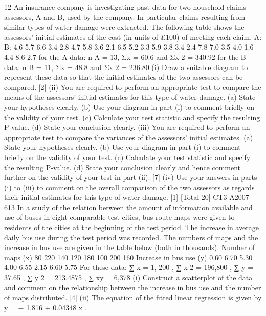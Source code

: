 \documentclass[a4paper,12pt]{article}
\begin{document}
\begin{enumerate}


12
An insurance company is investigating past data for two household claims assessors,
A and B, used by the company. In particular claims resulting from similar types of
water damage were extracted. The following table shows the assessors’ initial
estimates of the cost (in units of £100) of meeting each claim.
A:
B:
4.6
5.7
6.6
3.4
2.8
4.7
5.8
3.6
2.1
6.5
5.2
3.3
5.9
3.8
3.4
2.4
7.8
7.0
3.5
4.0
1.6
4.4
8.6
2.7
for the A data: n A = 13, Σx = 60.6 and Σx 2 = 340.92
for the B data: n B = 11, Σx = 48.8 and Σx 2 = 236.80
(i) Draw a suitable diagram to represent these data so that the initial estimates of
the two assessors can be compared.
[2]
(ii) You are required to perform an appropriate test to compare the means of the
assessors’ initial estimates for this type of water damage.
(a) State your hypotheses clearly.
(b) Use your diagram in part (i) to comment briefly on the validity of your
test.
(c) Calculate your test statistic and specify the resulting P-value.
(d) State your conclusion clearly.
(iii)
You are required to perform an appropriate test to compare the variances of
the assessors’ initial estimates.
(a) State your hypotheses clearly.
(b) Use your diagram in part (i) to comment briefly on the validity of your
test.
(c) Calculate your test statistic and specify the resulting P-value.
(d) State your conclusion clearly and hence comment further on the validity of your test in part (ii).
[7]
(iv)
Use your answers in parts (i) to (iii) to comment on the overall comparison of the two assessors as regards their initial estimates for this type of water damage.
[1]
[Total 20]
CT3 A2007—613
In a study of the relation between the amount of information available and use of
buses in eight comparable test cities, bus route maps were given to residents of the cities at the beginning of the test period. The increase in average daily bus use during the test period was recorded. The numbers of maps and the increase in bus use are
given in the table below (both in thousands).
Number of maps (x)
80 220 140 120 180 100 200 160
Increase in bus use (y) 0.60 6.70 5.30 4.00 6.55 2.15 6.60 5.75
For these data:
∑ x = 1, 200 , ∑ x 2 = 196,800 , ∑ y = 37.65 , ∑ y 2 = 213.4875 , ∑ xy = 6,378
(i) Construct a scatterplot of the data and comment on the relationship between
the increase in bus use and the number of maps distributed.
[4]
(ii) The equation of the fitted linear regression is given by y = − 1.816 + 0.04348 x .

\end{enumerate}
\end{document}
